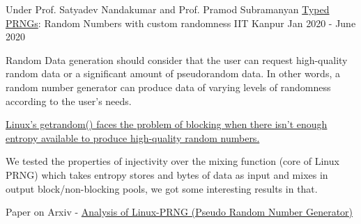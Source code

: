 \begin{cventries}


  \cventry
    {Under Prof. Satyadev Nandakumar and Prof. Pramod Subramanyan} %
    {\href{https://arxiv.org/abs/2312.03369}{Typed PRNGs}: Random Numbers with custom randomness} %
    {IIT Kanpur} %
    {Jan 2020 - June 2020} %
    {
      \begin{cvitems} %
      \item Random Data generation should consider that the user can request high-quality random data or a significant amount of pseudorandom data. In other words, a random number generator can produce data of varying levels of randomness according to the user's needs.
      \item \href{https://lwn.net/Articles/800509/}{Linux's getrandom() faces the problem of blocking when there isn't enough entropy available to produce high-quality random numbers.}
      \item We tested the properties of injectivity over the mixing function (core of Linux PRNG) which takes entropy stores and bytes of data as input and mixes in output block/non-blocking pools, we got some interesting results in that.
      \item Paper on Arxiv - \href{https://arxiv.org/abs/2312.03369}{Analysis of Linux-PRNG (Pseudo Random Number Generator)}
      \end{cvitems}
    }





\end{cventries}
